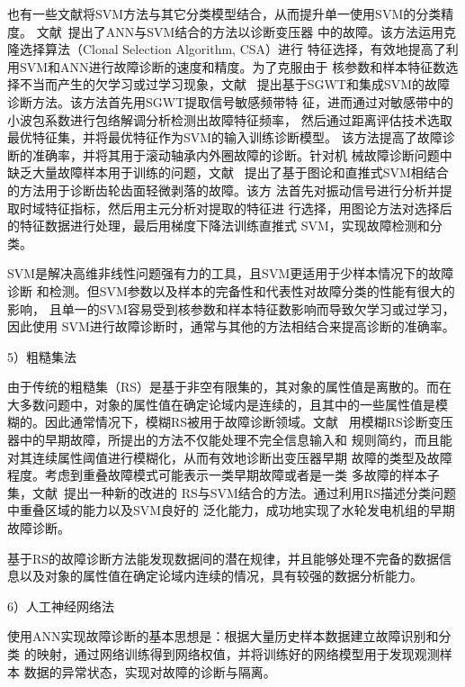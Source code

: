 也有一些文献将SVM方法与其它分类模型结合，从而提升单一使用SVM的分类精度。
文献~提出了ANN与SVM结合的方法以诊断变压器
中的故障。该方法运用克隆选择算法（Clonal Selection Algorithm, CSA）进行
特征选择，有效地提高了利用SVM和ANN进行故障诊断的速度和精度。为了克服由于
核参数和样本特征数选择不当而产生的欠学习或过学习现象，文献~
提出基于SGWT和集成SVM的故障诊断方法。该方法首先用SGWT提取信号敏感频带特
征，进而通过对敏感带中的小波包系数进行包络解调分析检测出故障特征频率，
然后通过距离评估技术选取最优特征集，并将最优特征作为SVM的输入训练诊断模型。
该方法提高了故障诊断的准确率，并将其用于滚动轴承内外圈故障的诊断。针对机
械故障诊断问题中缺乏大量故障样本用于训练的问题，文献~
提出了基于图论和直推式SVM相结合的方法用于诊断齿轮齿面轻微剥落的故障。该方
法首先对振动信号进行分析并提取时域特征指标，然后用主元分析对提取的特征进
行选择，用图论方法对选择后的特征数据进行处理，最后用梯度下降法训练直推式
SVM，实现故障检测和分类。

SVM是解决高维非线性问题强有力的工具，且SVM更适用于少样本情况下的故障诊断
和检测。但SVM参数以及样本的完备性和代表性对故障分类的性能有很大的影响，
且单一的SVM容易受到核参数和样本特征数影响而导致欠学习或过学习，因此使用
SVM进行故障诊断时，通常与其他的方法相结合来提高诊断的准确率。

5）粗糙集法

由于传统的粗糙集（RS）是基于非空有限集的，其对象的属性值是离散的。而在
大多数问题中，对象的属性值在确定论域内是连续的，且其中的一些属性值是模
糊的。因此通常情况下，模糊RS被用于故障诊断领域。文献~
用模糊RS诊断变压器中的早期故障，所提出的方法不仅能处理不完全信息输入和
规则简约，而且能对其连续属性阈值进行模糊化，从而有效地诊断出变压器早期
故障的类型及故障程度。考虑到重叠故障模式可能表示一类早期故障或者是一类
多故障的样本子集，文献~提出一种新的改进的
RS与SVM结合的方法。通过利用RS描述分类问题中重叠区域的能力以及SVM良好的
泛化能力，成功地实现了水轮发电机组的早期故障诊断。

基于RS的故障诊断方法能发现数据间的潜在规律，并且能够处理不完备的数据信
息以及对象的属性值在确定论域内连续的情况，具有较强的数据分析能力。

6）人工神经网络法

使用ANN实现故障诊断的基本思想是：根据大量历史样本数据建立故障识别和分类
的映射，通过网络训练得到网络权值，并将训练好的网络模型用于发现观测样本
数据的异常状态，实现对故障的诊断与隔离。

